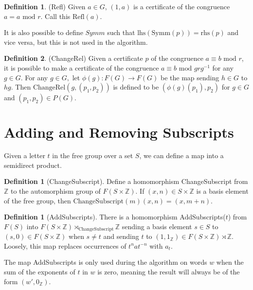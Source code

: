 \documentclass[11pt]{article} %
\theoremstyle{definition}
\theoremstyle{definition}
\theoremstyle{definition}
\theoremstyle{definition}
\theoremstyle{definition}
\newtheorem{defn}[theorem]{Definition}
\theoremstyle{definition}
\newtheorem{subdef}{Definition}[theorem]
\begin{document}
\begin{subdef}(Refl)
  Given $a \in G$, $(1, a)$ is a certificate of the congruence $a = a \text{ mod } r$. Call
  this $\text{Refl}(a)$.
\end{subdef}

It is also possible to define $\textit{Symm}$ such that $\text{lhs}(\text{Symm}(p)) = \text{rhs}(p)$
and vice versa, but this is not used in the algorithm.

\begin{subdef}(ChangeRel)
  Given a certificate $p$ of the congruence $a \equiv b \text{ mod } r$, it is possible
  to make a certificate of the congruence $a \equiv b \text{ mod } g r g^{-1}$ for any $g \in G$.
  For any $g \in G,$ let $\phi(g): F(G) \to F(G)$ be the map sending $h \in G$ to
  $hg$. Then $\text{ChangeRel}(g,(p_1,p_2))$ is defined to be $(\phi(g)(p_1), p_2)$ for
  $g \in G$ and $(p_1, p_2) \in P(G)$.
\end{subdef}

\section{Adding and Removing Subscripts}

Given a letter $t$ in the free group over a set $S$, we can define a map into a
semidirect product.

\begin{defn}[ChangeSubscript]\label{csub}
  Define a homomorphism ChangeSubscript from $\mathbb{Z}$ to the automorphism
  group of $F(S \times \mathbb{Z})$. If $(x, n) \in S \times \mathbb{Z}$ is a basis
  element of the free group, then $\text{ChangeSubscript}(m)(x, n) = (x, m + n)$.
\end{defn}

\begin{defn}[AddSubscripts]\label{AddSubscripts}
  There is a homomorphism AddSubscripts($t$) from $F(S)$ into $F(S \times \mathbb{Z})
  \rtimes_{\text{ChangeSubscript}} \mathbb{Z}$ sending a basis element $s \in S$ to
  $(s, 0) \in F(S \times \mathbb{Z})$ when $s \ne t$ and sending $t$ to
  $(1, 1_\mathbb{Z}) \in F(S \times \mathbb{Z}) \rtimes \mathbb{Z}$. Loosely, this map
  replaces occurrences of $t^n a t^{-n}$ with $a_t$.
\end{defn}

The map AddSubscripts is only used during the algorithm on words $w$ when the sum of the
exponents of $t$ in $w$ is zero, meaning the result will always be of the form
$(w', 0_{\mathbb{Z}})$.
\end{document}

